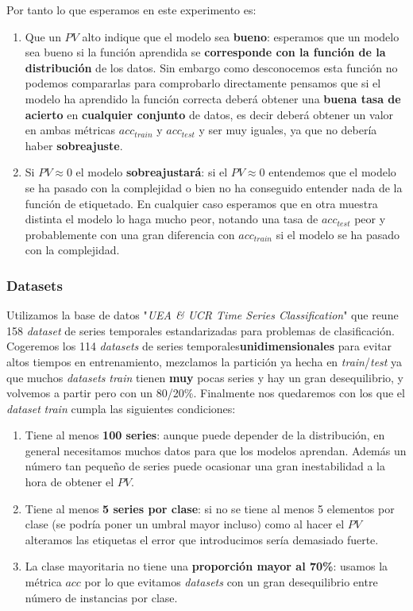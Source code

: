 Por tanto lo que esperamos en este experimento es:

\begin{enumerate}
  \item Que un $PV$ alto indique que el modelo sea \textbf{bueno}: esperamos que un modelo sea bueno si la función aprendida se \textbf{corresponde con la función de la distribución} de los datos. Sin embargo como desconocemos esta función no podemos compararlas para comprobarlo directamente pensamos que si el modelo ha aprendido la función correcta deberá obtener una \textbf{buena tasa de acierto} en \textbf{cualquier conjunto} de datos, es decir deberá obtener un valor en ambas métricas $acc_{train}$ y $acc_{test}$ y ser muy iguales, ya que no debería haber \textbf{sobreajuste}.

  \item Si $PV \approx 0$ el modelo \textbf{sobreajustará}: si el $PV \approx 0$ entendemos que el modelo se ha pasado con la complejidad o bien no ha conseguido entender nada de la función de etiquetado. En cualquier caso esperamos que en otra muestra distinta el modelo lo haga mucho peor, notando una tasa de $acc_{test}$ peor y probablemente con una gran diferencia con $acc_{train}$ si el modelo se ha pasado con la complejidad.
\end{enumerate}

\subsubsection{Datasets}

Utilizamos la base de datos "\emph{UEA \& UCR Time Series Classification}" \cite{bagnall2020ts} que reune 158 \emph{dataset} de series temporales estandarizadas para problemas de clasificación. Cogeremos los 114 \emph{datasets} de series temporales\textbf{unidimensionales} para evitar altos tiempos en entrenamiento, mezclamos la partición ya hecha en \emph{train}/\emph{test} ya que muchos \emph{datasets} \emph{train} tienen \textbf{muy} pocas series y hay un gran desequilibrio, y volvemos a partir pero con un 80/20\%. Finalmente nos quedaremos con los que el \emph{dataset} \emph{train} cumpla las siguientes condiciones:

\begin{enumerate}
  \item Tiene al menos \textbf{100 series}: aunque puede depender de la distribución, en general necesitamos muchos datos para que los modelos aprendan. Además un número tan pequeño de series puede ocasionar una gran inestabilidad a la hora de obtener el $PV$.
  \item Tiene al menos \textbf{5 series por clase}: si no se tiene al menos 5 elementos por clase (se podría poner un umbral mayor incluso) como al hacer el $PV$ alteramos las etiquetas el error que introducimos sería demasiado fuerte.
  \item La clase mayoritaria no tiene una \textbf{proporción mayor al 70\%}: usamos la métrica $acc$ por lo que evitamos \emph{datasets} con un gran desequilibrio entre número de instancias por clase.
\end{enumerate}

